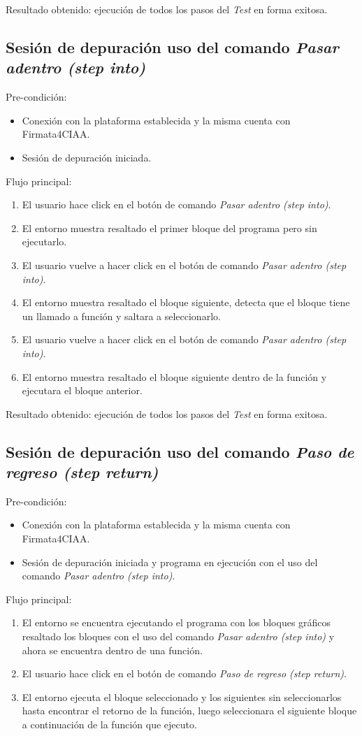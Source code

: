 Resultado obtenido: ejecución de todos los pasos del \emph{Test} en forma exitosa.  

\subsection{Sesión de depuración uso del comando \emph{Pasar adentro (step into)}}
Pre-condición:
\begin{itemize}
	\item Conexión con la plataforma establecida y la misma cuenta con Firmata4CIAA.
	\item Sesión de depuración iniciada. 
\end{itemize}

Flujo principal:
\begin{enumerate}
	\item
	El usuario hace click en el botón de comando \emph{Pasar adentro (step into)}.
	\item
	El entorno muestra resaltado el primer bloque del programa pero sin ejecutarlo.
	\item
	El usuario vuelve a hacer click en el botón de comando \emph{Pasar adentro (step into)}.
	\item
	El entorno muestra resaltado el bloque siguiente, detecta que el bloque tiene un llamado a función y saltara a seleccionarlo. 
	\item
	El usuario vuelve a hacer click en el botón de comando \emph{Pasar adentro (step into)}.
	\item
	El entorno muestra resaltado el bloque siguiente dentro de la función y ejecutara el bloque anterior. 
\end{enumerate}

Resultado obtenido: ejecución de todos los pasos del \emph{Test} en forma exitosa.  

\subsection{Sesión de depuración uso del comando \emph{Paso de regreso (step return)}}
Pre-condición:
\begin{itemize}
	\item Conexión con la plataforma establecida y la misma cuenta con Firmata4CIAA.
	\item Sesión de depuración iniciada y programa en ejecución con el uso del comando \emph{Pasar adentro (step into)}.
\end{itemize}

Flujo principal:
\begin{enumerate}
	\item
	El entorno se encuentra ejecutando el programa con los bloques gráficos resaltado los bloques con el uso del comando \emph{Pasar adentro (step into)} y ahora se encuentra dentro de una función.
	\item
	El usuario hace click en el botón de comando \emph{Paso de regreso (step return)}.
	\item
	El entorno ejecuta el bloque seleccionado y los siguientes sin seleccionarlos hasta encontrar el retorno de la función, luego seleccionara el siguiente bloque a continuación de la función que ejecuto.
\end{enumerate}

